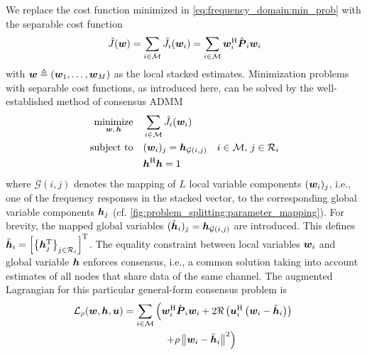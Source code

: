 \documentclass{article}
\begin{document}
We replace the cost function minimized in \eqref{eq:frequency_domain:min_prob} with the separable cost function 
\begin{equation}
    \tilde{J}({\bm{w}}) = \sum_{i \in \mathcal{M}} \tilde{J}_i({\bm{w}}_i)  = \sum_{i \in \mathcal{M}} {\bm{w}}_i^{\mathrm{H}} \hat{{\bm{{P}}}}_i {\bm{w}}_i
    \label{eq:problem_splitting:cost_function}
\end{equation}
with \({\bm{w}} \triangleq ({\bm{w}}_1,\ldots,{\bm{w}}_M)\) as the local stacked estimates.
Minimization problems with separable cost functions, as introduced here, can be solved by the well-established method of consensus ADMM \cite{boydDistributedOptimizationStatistical2011}
\begin{equation}
    \begin{aligned}
        \underset{{\bm{w}},\,{\bm{h}}}{\operatorname{minimize}} \quad &\sum_{i \in \mathcal{M}} \tilde{J}_i({\bm{w}}_i)\\
        \text{subject to} \quad &({\bm{w}}_i)_j = {\bm{h}}_{\mathcal{G}(i,j)}\quad i \in \mathcal{M},\,j \in \mathcal{R}_i\\
        &{\bm{h}}^{\mathrm{H}} {\bm{h}} = 1
    \end{aligned}\label{eq:general_consensus_admm:min_prob}
\end{equation}
where \(\mathcal{G}(i,j)\) denotes the mapping of \(L\) local variable components \(({\bm{w}}_i)_j\), i.e., one of the frequency responses in the stacked vector, to the corresponding global variable components \({\bm{h}}_j\) (cf. \autoref{fig:problem_splitting:parameter_mapping}).
For brevity, the mapped global variables \((\tilde{{\bm{h}}}_i)_j = {\bm{h}}_{\mathcal{G}(i,j)}\) are introduced.
This defines \(\tilde{{\bm{h}}}_i = \left[ \left\{ {\bm{h}}_j^{\mathrm{T}} \right\}_{j \in \mathcal{R}_i} \right]^{\mathrm{T}}\).
The equality constraint between local variables \({\bm{w}}_i\) and global variable \({\bm{h}}\) enforces consensus, i.e., a common solution taking into account estimates of all nodes that share data of the same channel.
The augmented Lagrangian for this particular general-form consensus problem is
\begin{equation}
    \begin{aligned}
        \mathcal{L}_{\rho} &(\wf,\hf,\uuf) = \sum_{i \in \Mset} \left( \wf_i^\herm \hat{\aRhof}_i \wf_i + 2 \Re \left( \uuf_i^{\herm} \left(\wf_i - \tilde{\hf}_i\right) \right)\right. \vphantom{+ \rho \left\| \wf_i - \tilde{\hf}_i \right\|^2}\\
        \vphantom{\wf_i^\herm \hat{\aRhof}_i \wf_i + 2 \Re \left( \uuf_i^{\herm} \left(\wf_i - \tilde{\hf}_i\right) \right)} & \qquad \qquad \qquad \qquad \left. + \rho \left\| \wf_i - \tilde{\hf}_i \right\|^2 \right)
    \end{aligned}\label{eq:general_consensus_admm:lagrangian}
\end{equation}
\end{document}
